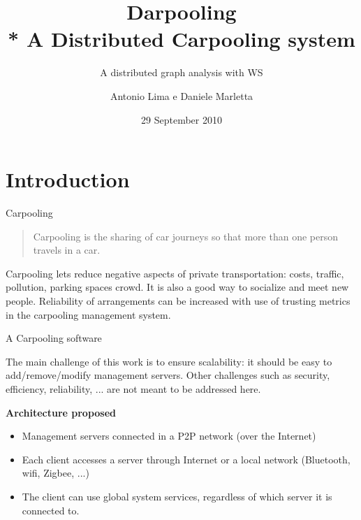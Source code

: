 \documentclass[mathserif]{beamer}
\title[Darpooling]
{Darpooling\\* A Distributed Carpooling system}
\subtitle{A distributed graph analysis with WS}
\author[A. Lima - D. Marletta]{Antonio Lima e Daniele Marletta}
\institute[UniCT]{
    Universit\`a degli Studi di Catania\\
        CdL in Ingegneria Informatica - Laurea Specialistica \\
        Corso di Sistemi Distribuiti
}
\date[29/09/2010]{29 September 2010}
\begin{document}
\begin{frame}[plain]
  \titlepage
\end{frame}
%

\section{Introduction}

\begin{frame}{Carpooling}  
\begin{quote}
Carpooling is the sharing of car journeys so that more than one person travels in a car.

\end{quote}

\vfill

Carpooling lets reduce negative aspects of private transportation: costs,
traffic, pollution, parking spaces crowd. It is also a good way to socialize and meet new people.
Reliability of arrangements can be increased with use of trusting metrics
in the carpooling management system.
\end{frame}

\begin{frame}{A Carpooling software}

The main challenge of this work is to ensure scalability: 
it should be easy to add/remove/modify management servers. Other challenges
such as security, efficiency, reliability, ... are not meant to be
addressed here.
\vfill

\textbf{Architecture proposed}
\begin{itemize}
\item
Management servers connected in a P2P network (over the Internet)
\item
Each client accesses a server through Internet or a local network 
(Bluetooth, wifi, Zigbee, ...)
\item
The client can use global system services, regardless of which server it is
connected to.
\end{itemize}
\end{frame}
\end{document}
